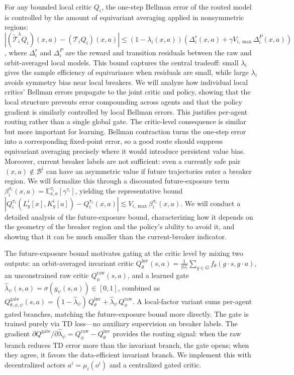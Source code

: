 \documentclass[11pt]{article}
\begin{document}
For any bounded local critic $Q_i$, the one-step Bellman error of the routed model is controlled by the amount of equivariant averaging applied in nonsymmetric regions: $|(\widetilde{\mathcal T}_i^\lambda Q_i)(x,a)-({\mathcal T}_i Q_i)(x,a)| \le (1-\lambda_i(x,a))(\Delta_i^r(x,a)+\gamma V_{i,\max}\Delta_i^P(x,a))$, where $\Delta_i^r$ and $\Delta_i^P$ are the reward and transition residuals between the raw and orbit-averaged local models. This bound captures the central tradeoff: small $\lambda_i$ gives the sample efficiency of equivariance when residuals are small, while large $\lambda_i$ avoids symmetry bias near local breakers.
We will analyze how individual local critics' Bellman errors propagate to the joint critic and policy, showing that the local structure prevents error compounding across agents and that the policy gradient is similarly controlled by local Bellman errors. This justifies per-agent routing rather than a single global gate.
The critic-level consequence is similar but more important for learning. Bellman contraction turns the one-step error into a corresponding fixed-point error, so a good route should suppress equivariant averaging precisely where it would introduce persistent value bias. Moreover, current breaker labels are not sufficient: even a currently safe pair $(x,a)\notin\mathcal B^i$ can have an asymmetric value if future trajectories enter a breaker region. We will formalize this through a discounted future-exposure term $\beta_i^{\pi_i}(x,a)=\mathbb E_{x,a}^{\pi_i}[\gamma^{\tau_i}]$, yielding the representative bound $|Q_i^{\pi_i}(L_g^i[x],K_g^i[a])-Q_i^{\pi_i}(x,a)| \lesssim V_{i,\max}\beta_i^{\pi_i}(x,a)$.
We will conduct a detailed analysis of the future-exposure bound, characterizing how it depends on the geometry of the breaker region and the policy's ability to avoid it, and showing that it can be much smaller than the current-breaker indicator.



The future-exposure bound motivates gating at the critic level by mixing two outputs: an orbit-averaged invariant critic $Q^{\text{inv}}_\theta(s, a) = \tfrac{1}{|G|}\sum_{g \in G} f_\theta(g\!\cdot\!s, g\!\cdot\!a)$, an unconstrained raw critic $Q^{\text{raw}}_\phi(s, a)$, and a learned gate $\widehat{\lambda}_\psi(s,a) = \sigma(g_\psi(s,a)) \in [0,1]$, combined as $Q^{\text{gate}}_{\theta,\phi,\psi}(s,a) = (1-\widehat{\lambda}_\psi)\,Q^{\text{inv}}_\theta + \widehat{\lambda}_\psi\,Q^{\text{raw}}_\phi$. A local-factor variant sums per-agent gated branches, matching the future-exposure bound more directly.
The gate is trained purely via TD loss—no auxiliary supervision on breaker labels. The gradient $\partial Q^{\text{gate}}/\partial \widehat{\lambda}_\psi = Q^{\text{raw}}_\phi - Q^{\text{inv}}_\theta$ provides the routing signal: when the raw branch reduces TD error more than the invariant branch, the gate opens; when they agree, it favors the data-efficient invariant branch. We implement this with decentralized actors $a^i = \mu_i(o^i)$ and a centralized gated critic.
\end{document}
